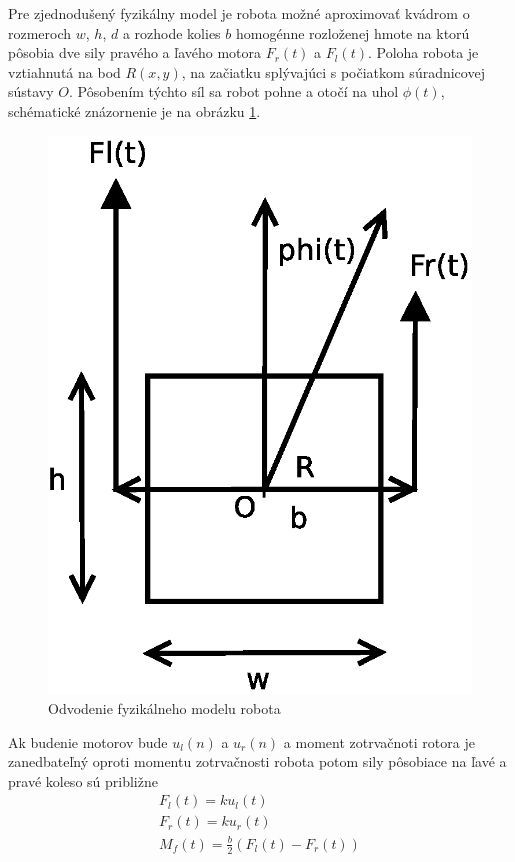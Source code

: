 Pre zjednodušený fyzikálny model je robota možné aproximovať kvádrom o rozmeroch $w$, $h$, $d$ a rozhode kolies
$b$ homogénne rozloženej hmote na ktorú pôsobia dve sily pravého a ľavého motora $F_r(t)$ a $F_l(t)$.
Poloha robota je vztiahnutá na bod $R(x, y)$, na začiatku splývajúci s počiatkom súradnicovej sústavy
$O$. Pôsobením týchto síl sa robot pohne a otočí na uhol $\phi(t)$, schématické znázornenie je na
obrázku \ref{img:motoko_model}.

\begin{figure}[!htb]
\center
\includegraphics[scale=.5]{../diagrams/robot_model.eps}
\caption{Odvodenie fyzikálneho modelu robota}
\label{img:motoko_model}
\end{figure}

Ak budenie motorov bude $u_l(n)$ a $u_r(n)$ a moment zotrvačnoti rotora
je zanedbateľný oproti momentu zotrvačnosti robota potom sily pôsobiace na ľavé a pravé koleso sú približne
\begin{align}
  F_l(t) = ku_l(t) \\
  F_r(t) = ku_r(t) \\
  M_f(t) = \frac{b}{2}(F_l(t) - F_r(t))
\end{align}

